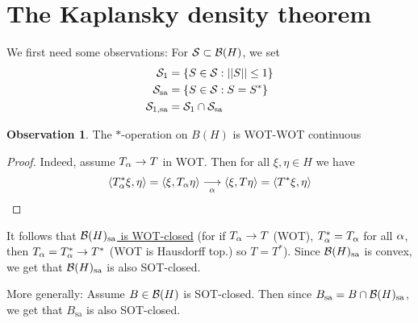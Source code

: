 \documentclass[10pt,english,a4paper]{article}
\theoremstyle{definition}
\newtheorem*{observation}{Observation}
\def\sa{\text{sa}}
\begin{document}
\section{The Kaplansky density theorem}
We first need some observations:
For $\mathcal{S} \subset \mathcal{B}(H)$, we set 
\begin{align*}
    \Ss_1 &= \{S \in \Ss: ||S|| \leq 1\} \\
    \Ss_{\sa} &= \{S \in \Ss: S = S^*\} \\
    \Ss_{1,\sa} &=\Ss_1 \cap \Ss_{\sa}
\end{align*}
\begin{observation}
    The $*$-operation on $B(H)$ is WOT-WOT continuous
\end{observation}
\begin{proof}
    Indeed, assume $T_{\alpha} \to T$ in WOT. Then for all 
$\xi,\eta \in H$ we have 
\begin{align*}
    \left\langle T_{\alpha}^{*}\xi,\eta \right\rangle = \left\langle \xi,T_{\alpha}\eta \right\rangle \underset{\alpha}{\longrightarrow}
\left\langle \xi, T\eta \right\rangle = \left\langle T^*\xi,\eta \right\rangle 
\end{align*}
\end{proof}
It follows that \ul{$\Bs(H)_{\sa}$ is WOT-closed}
(for if $T_{\alpha}\to T$ (WOT), $T_{\alpha}^* = T_{\alpha}$ for all $\alpha$,
then $T_{\alpha}= T^{*}_{\alpha}\to T^*$ (WOT is Hausdorff top.) so $T=T^*$).
Since $\Bs(H)_{\sa}$ is convex, we get that 
$\Bs(H)_{\sa}$ is also SOT-closed.

More generally: Assume $B \in \mathcal{B}(H)$ is SOT-closed. Then since 
$B_{\sa} = B\cap \Bs(H)_{\sa}$, we get that $B_{\sa}$ is also SOT-closed.
\end{document}
